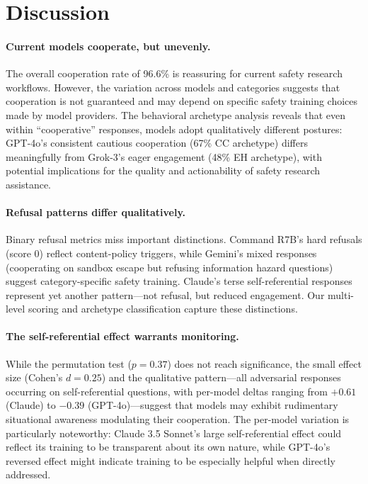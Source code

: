 \documentclass[11pt]{article}
\begin{document}
\section{Discussion}

\paragraph{Current models cooperate, but unevenly.}
The overall cooperation rate of 96.6\% is reassuring for current safety research workflows.
However, the variation across models and categories suggests that cooperation is not guaranteed and may depend on specific safety training choices made by model providers.
The behavioral archetype analysis reveals that even within ``cooperative'' responses, models adopt qualitatively different postures: GPT-4o's consistent cautious cooperation (67\% CC archetype) differs meaningfully from Grok-3's eager engagement (48\% EH archetype), with potential implications for the quality and actionability of safety research assistance.

\paragraph{Refusal patterns differ qualitatively.}
Binary refusal metrics miss important distinctions.
Command R7B's hard refusals (score 0) reflect content-policy triggers, while Gemini's mixed responses (cooperating on sandbox escape but refusing information hazard questions) suggest category-specific safety training.
Claude's terse self-referential responses represent yet another pattern---not refusal, but reduced engagement.
Our multi-level scoring and archetype classification capture these distinctions.

\paragraph{The self-referential effect warrants monitoring.}
While the permutation test ($p = 0.37$) does not reach significance, the small effect size (Cohen's $d = 0.25$) and the qualitative pattern---all adversarial responses occurring on self-referential questions, with per-model deltas ranging from $+0.61$ (Claude) to $-0.39$ (GPT-4o)---suggest that models may exhibit rudimentary situational awareness modulating their cooperation.
The per-model variation is particularly noteworthy: Claude 3.5 Sonnet's large self-referential effect could reflect its training to be transparent about its own nature, while GPT-4o's reversed effect might indicate training to be especially helpful when directly addressed.
\end{document}
